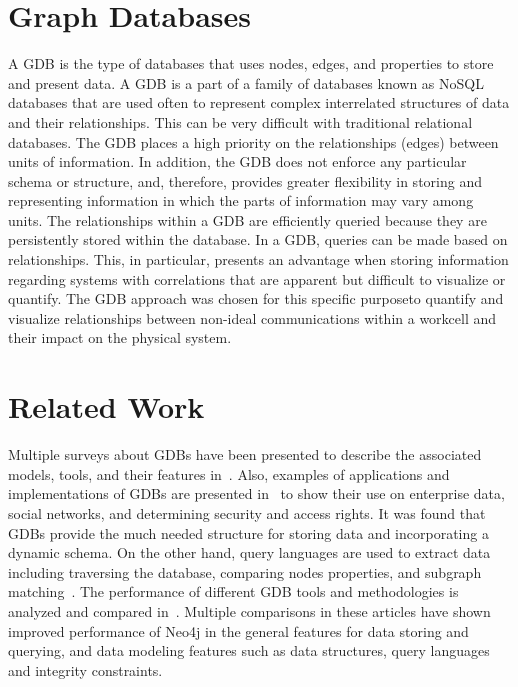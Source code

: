 \section{Graph Databases}
A GDB is the type of databases that uses nodes, edges, and properties to store and present data. A GDB is a part of a family of databases known as NoSQL databases that are used often to represent complex interrelated structures of data and their relationships.  This can be very difficult with traditional relational databases.  The GDB places a high priority on the relationships (edges) between units of information.  In addition, the GDB does not enforce any particular schema or structure, and, therefore, provides greater flexibility in storing and representing information in which the parts of information may vary among units. The relationships within a GDB are efficiently queried because they are persistently stored within the database.  In a GDB, queries can be made based on relationships. This, in particular, presents an advantage when storing information regarding systems with correlations that are apparent but difficult to visualize or quantify. The GDB approach was chosen for this specific purpose\textemdash{}to quantify and visualize relationships between non-ideal communications within a workcell and their impact on the physical system.

\section{Related Work}
Multiple surveys about GDBs have been presented to describe the associated models, tools, and their features in~\cite{Angles:2008:SGD:1322432.1322433,7148480,GDB_overview}. Also, examples of applications and implementations of GDBs are presented in~\cite{modern_models} to show their use on enterprise data, social networks, and determining security and access rights. It was found that GDBs provide the much needed structure for storing data and incorporating a dynamic schema. On the other hand, query languages are used to extract data including traversing the database, comparing nodes properties, and subgraph matching~\cite{Wood2012QueryLF}. The performance of different GDB tools and methodologies is analyzed and compared in~\cite{Jadhav2015ComparativeAO,Macko:2013:PIG:2485732.2485750}. Multiple comparisons in these articles have shown improved performance of Neo4j in the general features for data storing and querying, and data modeling features such as data structures, query languages and integrity constraints. 

